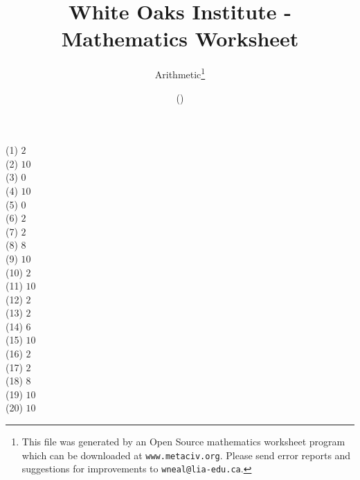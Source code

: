 \documentclass[letter]{article}
\begin{document}
\title{White Oaks Institute - Mathematics Worksheet}
\author{Arithmetic\thanks{This file was generated by an \textsf{Open Source} mathematics worksheet program which can be downloaded at \texttt{www.metaciv.org}. Please send error reports and suggestions for improvements to \texttt{wneal@lia-edu.ca}.}}
\date{\XCfileversion{} (\XCfiledate)}
\maketitle
\begin{multicols}{2}(1) $2$\\(2) $10$\\(3) $0$\\(4) $10$\\(5) $0$\\(6) $2$\\(7) $2$\\(8) $8$\\(9) $10$\\(10) $2$\\(11) $10$\\(12) $2$\\(13) $2$\\(14) $6$\\(15) $10$\\(16) $2$\\(17) $2$\\(18) $8$\\(19) $10$\\(20) $10$\end{multicols}
\end{document}
